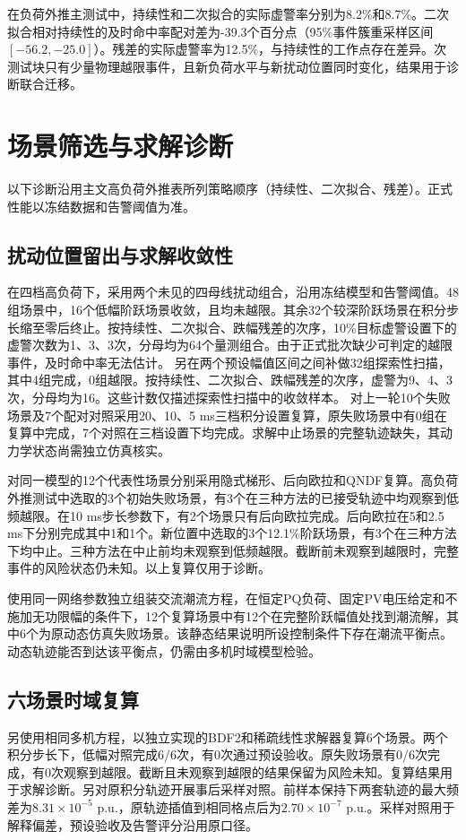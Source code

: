 \documentclass[UTF8,a4paper,11pt]{ctexart}
\begin{document}
在负荷外推主测试中，持续性和二次拟合的实际虚警率分别为8.2\%和8.7\%。二次拟合相对持续性的及时命中率配对差为-39.3个百分点（95\%事件簇重采样区间$[-56.2,-25.0]$）。残差的实际虚警率为12.5\%，与持续性的工作点存在差异。次测试块只有少量物理越限事件，且新负荷水平与新扰动位置同时变化，结果用于诊断联合迁移。

\section{场景筛选与求解诊断}
以下诊断沿用主文高负荷外推表所列策略顺序（持续性、二次拟合、残差）。正式性能以冻结数据和告警阈值为准。

\subsection{扰动位置留出与求解收敛性}
在四档高负荷下，采用两个未见的四母线扰动组合，沿用冻结模型和告警阈值。48组场景中，16个低幅阶跃场景收敛，且均未越限。其余32个较深阶跃场景在积分步长缩至零后终止。按持续性、二次拟合、跌幅残差的次序，10\%目标虚警设置下的虚警次数为1、3、3次，分母均为64个量测组合。由于正式批次缺少可判定的越限事件，及时命中率无法估计。
另在两个预设幅值区间之间补做32组探索性扫描，其中4组完成，0组越限。按持续性、二次拟合、跌幅残差的次序，虚警为9、4、3次，分母均为16。这些计数仅描述探索性扫描中的收敛样本。 对上一轮10个失败场景及7个配对对照采用20、10、5 ms三档积分设置复算，原失败场景中有0组在复算中完成，7个对照在三档设置下均完成。求解中止场景的完整轨迹缺失，其动力学状态尚需独立仿真核实。

对同一模型的12个代表性场景分别采用隐式梯形、后向欧拉和QNDF复算。高负荷外推测试中选取的3个初始失败场景，有3个在三种方法的已接受轨迹中均观察到低频越限。在10 ms步长参数下，有2个场景只有后向欧拉完成。后向欧拉在5和2.5 ms下分别完成其中1和1个。新位置中选取的3个12.1\%阶跃场景，有3个在三种方法下均中止。三种方法在中止前均未观察到低频越限。截断前未观察到越限时，完整事件的风险状态仍未知。以上复算仅用于诊断。

使用同一网络参数独立组装交流潮流方程，在恒定PQ负荷、固定PV电压给定和不施加无功限幅的条件下，12个复算场景中有12个在完整阶跃幅值处找到潮流解，其中6个为原动态仿真失败场景。该静态结果说明所设控制条件下存在潮流平衡点。动态轨迹能否到达该平衡点，仍需由多机时域模型检验。

\subsection{六场景时域复算}
另使用相同多机方程，以独立实现的BDF2和稀疏线性求解器复算6个场景。两个积分步长下，低幅对照完成6/6次，有0次通过预设验收。原失败场景有0/6次完成，有0次观察到越限。截断且未观察到越限的结果保留为风险未知。复算结果用于求解诊断。另对原积分轨迹开展事后采样对照。前样本保持下两套轨迹的最大频差为$8.31\times10^{-5}$ p.u.，原轨迹插值到相同格点后为$2.70\times10^{-7}$ p.u.。采样对照用于解释偏差，预设验收及告警评分沿用原口径。
\end{document}
